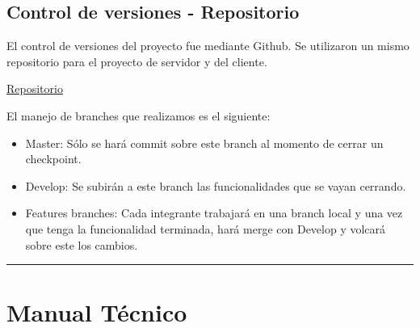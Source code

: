 \documentclass[letterpaper,10pt,english]{sphinxmanual}
\begin{document}
\section{Control de versiones - Repositorio}
\label{uDriveDoc:control-de-versiones-repositorio}
El control de versiones del proyecto fue mediante Github.
Se utilizaron un mismo repositorio para el proyecto de servidor y del cliente.

\href{https://github.com/martineq/tp7552.git}{Repositorio}

El manejo de branches que realizamos es el siguiente:
\begin{itemize}
\item {} 
Master: Sólo se hará commit sobre este branch al momento de cerrar un checkpoint.

\item {} 
Develop: Se subirán a este branch las funcionalidades que se vayan cerrando.

\item {} 
Features branches: Cada integrante trabajará en una branch local y una vez que tenga la funcionalidad terminada, hará merge con Develop y volcará sobre este los cambios.

\end{itemize}


\bigskip\hrule{}\bigskip



\chapter{Manual Técnico}
\label{uDriveDoc:manual-tecnico}
\end{document}
